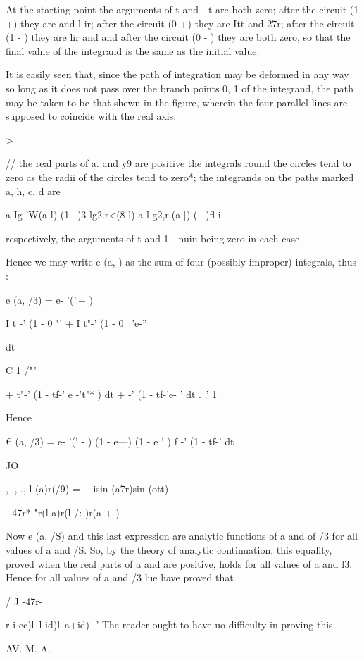 %
%

At the starting-point the arguments of t and - t are both zero; after
the circuit (1 +) they are and l-ir; after the circuit (0 +) they are
Itt and 27r; after the circuit (1 - ) they are lir and and after the
circuit (0 - ) they are both zero, so that the final vahie of the
integrand is the same as the initial value.

It is easily seen that, since the path of integration may be deformed
in any way so long as it does not pass over the branch points 0, 1 of
the integrand, the path may be taken to be that shewn in the figure,
wherein the four parallel lines are supposed to coincide with the real
axis.

>

// the real parts of a. and y9 are positive the integrals round the
circles tend to zero as the radii of the circles tend to zero*; the
integrands on the paths marked a, h, c, d are

 a-Ig-'W(a-l) (1 \ )3-lg2.r<(8-l) a-l g2,r.(a-]) ( \ )fl-i

respectively, the arguments of t and 1 - nuiu being zero in each case.

Hence we may write e (a, ) as the sum of four (possibly improper)
integrals, thus :

e (a, /3) = e- '(''+ )

I t -' (1 - 0 "' + I t"-' (1 - 0 ~'e-''

 dt

C 1 /""

+ t"-' (1 - tf-' e -'t"* ) dt + -' (1 - tf-'e- ' dt . .' 1

Hence

€ (a, /3) = e- '(' - ) (1 - e---) (1 - e ' ) f -' (1 - tf-' dt

JO

, ., ., l (a)r(/9) = - -isin (a7r)sin (ott) ~

- 47r* "r(l-a)r(l-/: )r(a + )-

Now e (a, /S) and this last expression are analytic functions of a and
of /3 for all values of a and /S. So, by the theory of analytic
continuation, this equality, proved when the real parts of a and are
positive, holds for all values of a and l3. Hence for all values of a
and /3 lue have proved that

/ J -47r-

r i-cc)l\ l-id)l\ a+id)- ' The reader ought to have uo difficulty in
proving this.

AV. M. A.

